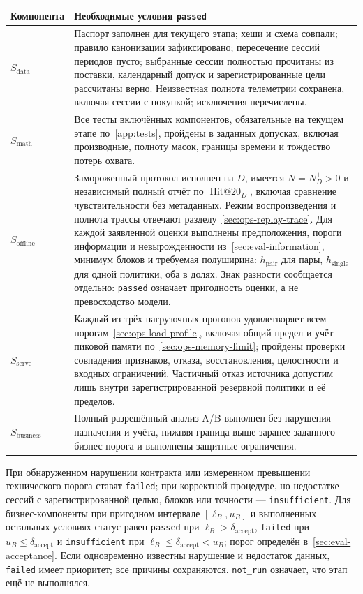 \documentclass[12pt,a4paper]{article}
\newcommand{\code}[1]{{\ttfamily\small\nolinkurl{#1}}}
\theoremstyle{plainru}
\begin{document}
\begin{longtable}{L{0.16\textwidth}L{0.73\textwidth}}
\toprule Компонента & Необходимые условия \code{passed} \\\midrule\endhead
$S_{\mathrm{data}}$ & Паспорт заполнен для текущего этапа; хеши и схема
совпали; правило канонизации зафиксировано; пересечение сессий периодов
пусто; выбранные сессии полностью прочитаны из поставки, календарный
допуск и зарегистрированные цели рассчитаны верно. Неизвестная полнота
телеметрии сохранена, включая сессии с покупкой; исключения перечислены. \\
$S_{\mathrm{math}}$ & Все тесты включённых компонентов, обязательные
на текущем этапе по~\ref{app:tests}, пройдены в заданных допусках, включая производные,
полноту масок, границы времени и тождество потерь охвата. \\
$S_{\mathrm{offline}}$ & Замороженный протокол исполнен на $D$, имеется
$N=N_D^+>0$ и независимый полный отчёт по $\operatorname{Hit@20}_D$,
включая сравнение чувствительности
без метаданных. Режим воспроизведения и полнота трассы отвечают
разделу~\ref{sec:ops-replay-trace}. Для каждой заявленной оценки
выполнены предположения, пороги информации и невырожденности
из~\ref{sec:eval-information}, минимум блоков и требуемая полуширина:
$h_{\mathrm{pair}}$ для пары, $h_{\mathrm{single}}$ для одной политики,
оба в долях.
Знак разности сообщается отдельно: \code{passed} означает пригодность
оценки, а не превосходство модели. \\
$S_{\mathrm{serve}}$ & Каждый из трёх нагрузочных прогонов удовлетворяет
всем порогам~\ref{sec:ops-load-profile}, включая общий предел и учёт
пиковой памяти по~\ref{sec:ops-memory-limit}; пройдены проверки
совпадения признаков, отказа, восстановления, целостности и входных ограничений.
Частичный отказ источника допустим лишь внутри зарегистрированной
резервной политики и её пределов. \\
$S_{\mathrm{business}}$ & Полный разрешённый анализ A/B выполнен без
нарушения назначения и учёта, нижняя граница выше заранее заданного
бизнес-порога и выполнены защитные ограничения. \\
\bottomrule
\end{longtable}
При обнаруженном нарушении контракта или измеренном превышении
технического порога ставят \code{failed}; при корректной процедуре,
но недостатке сессий с зарегистрированной целью, блоков или точности --- \code{insufficient}.
Для бизнес-компоненты при пригодном интервале $[\ell_B,u_B]$ и выполненных
остальных условиях статус равен \code{passed} при
$\ell_B>\delta_{\mathrm{accept}}$, \code{failed} при
$u_B\le\delta_{\mathrm{accept}}$ и \code{insufficient} при
$\ell_B\le\delta_{\mathrm{accept}}<u_B$;
порог определён в~\ref{sec:eval-acceptance}. Если одновременно известны
нарушение и недостаток данных, \code{failed} имеет приоритет;
все причины сохраняются.
\code{not_run} означает, что этап ещё не выполнялся.
\end{document}
